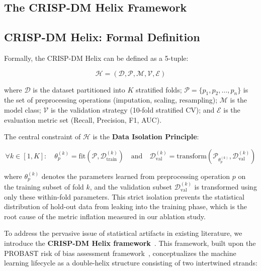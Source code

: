 \documentclass[3p,twocolumn]{elsarticle}
\begin{document}
\subsection{The CRISP-DM Helix Framework}

\subsection{CRISP-DM Helix: Formal Definition}

Formally, the CRISP-DM Helix can be defined as a 5-tuple:

\begin{equation}
\mathcal{H} = ( \mathcal{D}, \mathcal{P}, \mathcal{M}, \mathcal{V}, \mathcal{E} )
\end{equation}

where $\mathcal{D}$ is the dataset partitioned into $K$ stratified folds; $\mathcal{P} = \{p_1, p_2, \ldots, p_n\}$ is the set of preprocessing operations (imputation, scaling, resampling); $\mathcal{M}$ is the model class; $\mathcal{V}$ is the validation strategy (10-fold stratified CV); and $\mathcal{E}$ is the evaluation metric set (Recall, Precision, F1, AUC).

The central constraint of $\mathcal{H}$ is the \textbf{Data Isolation Principle}:

\begin{equation}
\forall k \in [1,K]: \quad \theta_{p}^{(k)} = \text{fit}(\mathcal{P}, \mathcal{D}_{\text{train}}^{(k)}) \quad \text{and} \quad \mathcal{D}_{\text{val}}^{(k)} = \text{transform}(\mathcal{P}_{\theta_{p}^{(k)}}, \mathcal{D}_{\text{val}}^{(k)})
\end{equation}

where $\theta_{p}^{(k)}$ denotes the parameters learned from preprocessing operation $p$ on the training subset of fold $k$, and the validation subset $\mathcal{D}_{\text{val}}^{(k)}$ is transformed using only these within-fold parameters. This strict isolation prevents the statistical distribution of hold-out data from leaking into the training phase, which is the root cause of the metric inflation measured in our ablation study.

To address the pervasive issue of statistical artifacts in existing literature, we introduce the \textbf{CRISP-DM Helix framework}~\cite{Kapoor2024Leakage}. This framework, built upon the PROBAST risk of bias assessment framework~\cite{Moons2019PROBAST}, conceptualizes the machine learning lifecycle as a double-helix structure consisting of two intertwined strands:
\end{document}
